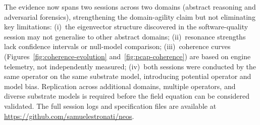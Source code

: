 The evidence now spans two sessions across two domains (abstract
reasoning and adversarial forensics), strengthening the domain-agility
claim but not eliminating key limitations: (i)~the eigenvector
structure discovered in the software-quality session may not generalise
to other abstract domains; (ii)~resonance strengths lack confidence
intervals or null-model comparison; (iii)~coherence curves
(Figures~\ref{fig:coherence-evolution} and~\ref{fig:pcap-coherence})
are based on engine telemetry, not independently measured;
(iv)~both sessions were conducted by the same operator on the same
substrate model, introducing potential operator and model bias.
Replication across additional domains, multiple operators, and diverse
substrate models is required before the field equation can be
considered validated.  The full session logs and specification files
are available at \url{https://github.com/samuelestronati/neos}.
